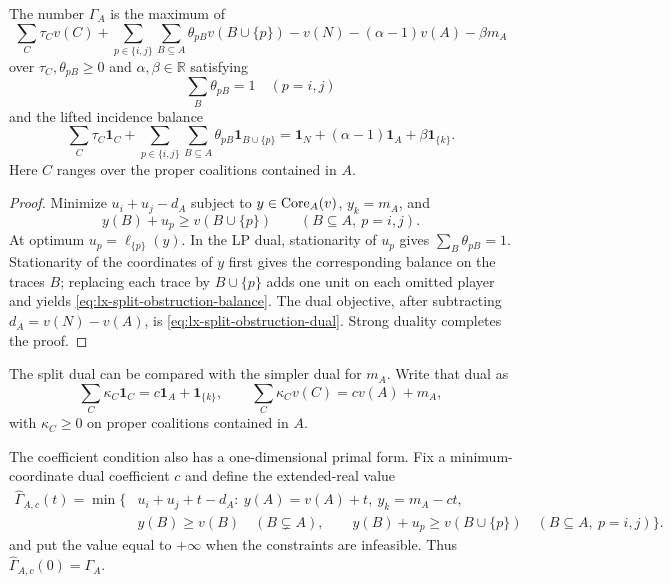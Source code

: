 \begin{lemma}
\label{lem:lx-split-obstruction-dual}
The number $\Gamma_A$ is the maximum of
\[
 \sum_C\tau_Cv(C)+
 \sum_{p\in\{i,j\}}\sum_{B\subseteq A}\theta_{pB}v(B\cup\{p\})
 -v(N)-(\alpha-1)v(A)-\beta m_A                         \tag{SDD}
 \label{eq:lx-split-obstruction-dual}
\]
over $\tau_C,\theta_{pB}\geq0$ and $\alpha,\beta\in\mathbb R$ satisfying
\[
 \sum_B\theta_{pB}=1\quad(p=i,j)
\]
and the lifted incidence balance
\[
 \sum_C\tau_C\mathbf1_C+
 \sum_{p\in\{i,j\}}\sum_{B\subseteq A}
       \theta_{pB}\mathbf1_{B\cup\{p\}}
 =\mathbf1_N+(\alpha-1)\mathbf1_A+\beta\mathbf1_{\{k\}}.
 \tag{SDB}\label{eq:lx-split-obstruction-balance}
\]
Here $C$ ranges over the proper coalitions contained in $A$.
\end{lemma}

\begin{proof}
Minimize $u_i+u_j-d_A$ subject to $y\in\operatorname{Core}_A(v)$, $y_k=m_A$, and
\[
 y(B)+u_p\geq v(B\cup\{p\})
 \qquad(B\subseteq A,\ p=i,j).
\]
At optimum $u_p=\ell_{\{p\}}(y)$.  In the LP dual, stationarity of $u_p$
gives $\sum_B\theta_{pB}=1$.  Stationarity of the coordinates of $y$ first
gives the corresponding balance on the traces $B$; replacing each trace by
$B\cup\{p\}$ adds one unit on each omitted player and yields
\eqref{eq:lx-split-obstruction-balance}.  The dual objective, after
subtracting $d_A=v(N)-v(A)$, is
\eqref{eq:lx-split-obstruction-dual}.  Strong duality completes the proof.
\end{proof}

The split dual can be compared with the simpler dual for $m_A$.  Write that
dual as
\[
 \sum_C\kappa_C\mathbf1_C=c\mathbf1_A+\mathbf1_{\{k\}},
 \qquad
 \sum_C\kappa_Cv(C)=cv(A)+m_A,                         \tag{MD}
 \label{eq:lx-minimum-coordinate-dual}
\]
with $\kappa_C\geq0$ on proper coalitions contained in $A$.

The coefficient condition also has a one-dimensional primal form.  Fix a
minimum-coordinate dual coefficient $c$ and define the extended-real value
\[
 \begin{split}
 \widehat\Gamma_{A,c}(t)=\min\{&u_i+u_j+t-d_A:\
       y(A)=v(A)+t,\ y_k=m_A-ct,\\
   &y(B)\geq v(B)\quad(B\subsetneq A),\qquad
       y(B)+u_p\geq v(B\cup\{p\})
       \quad(B\subseteq A,\ p=i,j)\}.
 \end{split}
 \tag{PT}\label{eq:lx-minimum-dual-tangent}
\]
and put the value equal to $+\infty$ when the constraints are infeasible.
Thus $\widehat\Gamma_{A,c}(0)=\Gamma_A$.

